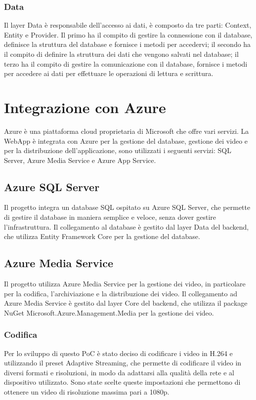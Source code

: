 \subsubsection{Data}
Il layer Data è responsabile dell'accesso ai dati, è composto da tre parti: Context, Entity e Provider. Il primo ha il compito di gestire la connessione con il database, definisce la struttura del database e fornisce i metodi per accedervi; il secondo ha il compito di definire la struttura dei dati che vengono salvati nel database; il terzo ha il compito di gestire la comunicazione con il database, fornisce i metodi per accedere ai dati per effettuare le operazioni di lettura e scrittura.\\

\section{Integrazione con Azure}
Azure è una piattaforma cloud proprietaria di Microsoft che offre vari servizi.
La WebApp è integrata con Azure per la gestione del database, gestione dei video e per la distribuzione dell'applicazione, sono utilizzati i seguenti servizi: SQL Server, Azure Media Service e Azure App Service.\\
\subsection{Azure SQL Server}
Il progetto integra un database SQL ospitato su Azure SQL Server, che permette di gestire il database in maniera semplice e veloce, senza dover gestire l'infrastruttura. Il collegamento al database è gestito dal layer Data del backend, che utilizza Entity Framework Core per la gestione del database.\\
\subsection{Azure Media Service}
Il progetto utilizza Azure Media Service per la gestione dei video, in particolare per la codifica, l'archiviazione e la distribuzione dei video. Il collegamento ad Azure Media Service è gestito dal layer Core del backend, che utilizza il package NuGet Microsoft.Azure.Management.Media per la gestione dei video.\\
\subsubsection{Codifica}
Per lo sviluppo di questo PoC è stato deciso di codificare i video in H.264 e utilizzando il preset Adaptive Streaming, che permette di codificare il video in diversi formati e risoluzioni, in modo da adattarsi alla qualità della rete e al dispositivo utilizzato. Sono state scelte queste impostazioni che permettono di ottenere un video di risoluzione massima pari a 1080p.\\
